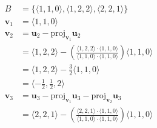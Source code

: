 \documentclass{article}
\begin{document}
\setcounter{subsubsection}{8}
\subsubsection{}

\begin{align*}
  B            & = \{ \langle 1, 1, 0 \rangle, \langle 1, 2, 2 \rangle, \langle 2, 2, 1 \rangle \}                                                                                                                                                                       \\
  \mathbf{v}_1 & = \langle 1, 1, 0 \rangle                                                                                                                                                                                                                               \\
  \mathbf{v}_2 & = \mathbf{u}_2 - \text{proj}_{\mathbf{v}_1} \mathbf{u}_2                                                                                                                                                                                                \\
               & = \langle 1, 2, 2 \rangle - \left( \frac{\langle 1, 2, 2 \rangle \cdot \langle 1, 1, 0 \rangle}{\langle 1, 1, 0 \rangle \cdot \langle 1, 1, 0 \rangle} \right) \langle 1, 1, 0 \rangle                                                                  \\
               & = \langle 1, 2, 2 \rangle - \frac{3}{2} \langle 1, 1, 0 \rangle                                                                                                                                                                                         \\
               & = \langle -\frac{1}{2}, \frac{1}{2}, 2 \rangle                                                                                                                                                                                                          \\
  \mathbf{v}_3 & = \mathbf{u}_3 - \text{proj}_{\mathbf{v}_1} \mathbf{u}_3 - \text{proj}_{\mathbf{v}_2} \mathbf{u}_3                                                                                                                                                      \\
               & = \langle 2, 2, 1 \rangle - \left( \frac{\langle 2, 2, 1 \rangle \cdot \langle 1, 1, 0 \rangle}{\langle 1, 1, 0 \rangle \cdot \langle 1, 1, 0 \rangle} \right) \langle 1, 1, 0 \rangle                                                                  \\

\end{align*}
\end{document}
